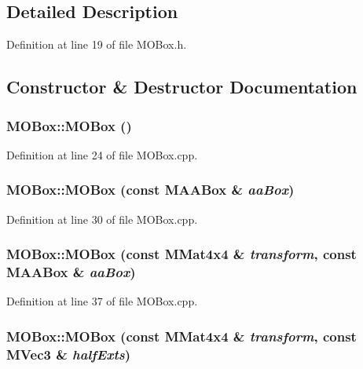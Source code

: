 \subsection{Detailed Description}


Definition at line 19 of file MOBox.h.

\subsection{Constructor \& Destructor Documentation}
\hypertarget{class_m_o_box_7bf83cd9171ed3f579582c063f9c5cc9}{
\subsubsection[{MOBox}]{\setlength{\rightskip}{0pt plus 5cm}MOBox::MOBox ()}}
\label{class_m_o_box_7bf83cd9171ed3f579582c063f9c5cc9}




Definition at line 24 of file MOBox.cpp.\hypertarget{class_m_o_box_d49b5de844f48790b8fe784d0f07d388}{
\subsubsection[{MOBox}]{\setlength{\rightskip}{0pt plus 5cm}MOBox::MOBox (const {\bf MAABox} \& {\em aaBox})}}
\label{class_m_o_box_d49b5de844f48790b8fe784d0f07d388}




Definition at line 30 of file MOBox.cpp.\hypertarget{class_m_o_box_7f53529680eb35e91d981ab83d0f4bb8}{
\subsubsection[{MOBox}]{\setlength{\rightskip}{0pt plus 5cm}MOBox::MOBox (const {\bf MMat4x4} \& {\em transform}, \/  const {\bf MAABox} \& {\em aaBox})}}
\label{class_m_o_box_7f53529680eb35e91d981ab83d0f4bb8}




Definition at line 37 of file MOBox.cpp.\hypertarget{class_m_o_box_9c3fbd1a7b8484cc2ebaefdee6ed1238}{
\subsubsection[{MOBox}]{\setlength{\rightskip}{0pt plus 5cm}MOBox::MOBox (const {\bf MMat4x4} \& {\em transform}, \/  const {\bf MVec3} \& {\em halfExts})}}
\label{class_m_o_box_9c3fbd1a7b8484cc2ebaefdee6ed1238}




